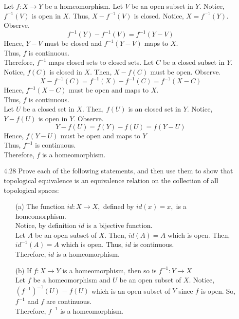 \documentclass[12pt]{article}
\begin{document}
\begin{enumerate}
	Let $f : X \rightarrow Y$ be a homeomorphism. Let $ V $ be an open subset in $ Y $. Notice, $ f^{-1}(V) $ is open in $ X $. Thus, $ X-f^{-1}(V) $ is closed. Notice, $ X=f^{-1}(Y) $. Observe.
		\[f^{-1}(Y)-f^{-1}(V)=f^{-1}(Y-V)\]
	Hence, $ Y-V $ must be closed and $ f^{-1}(Y-V) $ maps to $ X $.\\
	Thus, $ f $ is continuous.\\
	Therefore, $ f^{-1} $ maps closed sets to closed sets.
 	Let $C$ be a closed subset in $ Y $. Notice, $ f(C) $ is closed in $ X $. Then, $ X-f(C)  $ must be open. Observe.
 		\[X-f^{-1}(C)=f^{-1}(X)-f^{-1}(C)=f^{-1}(X-C)\]
 	Hence, $f^{-1}(X-C)$ must be open and maps to $ X $.\\
 	Thus, $ f $ is continuous.\\
 	Let $ U $ be a closed set in $ X $. Then, $ f(U)$ is an closed set in $ Y $. Notice, $ Y-f(U) $ is open in $ Y $. Observe.
 		\[Y-f(U)=f(Y)-f(U)=f(Y-U)\]
 	Hence, $ f(Y-U) $ must be open and maps to $Y$\\
 	Thus, $ f^{-1} $ is continuous.\\
 	Therefore, $ f $ is a homeomorphism.
	
	\item[4.28] Prove each of the following statements, and then use them to show that topological equivalence is an equivalence relation on the collection of all topological spaces:
	\begin{enumerate}
		\item[(a)] The function $i d : X \rightarrow X ,$ defined by $i d ( x ) = x ,$ is a homeomorphism.\\
		Notice,  by definition $ id $ is a bijective function.  \\
		Let $ A $ be an open subset of $ X $. Then, $ id(A)=A $ which is open. Then, $ id^{-1}(A)=A $ which is open. Thus, $ id $ is continuous.\\
		Therefore, $ id $ is a homeomorphism.
		
		\item[(b)] If $f : X \rightarrow Y$ is a homeomorphism, then so is $f ^ { - 1 } : Y \rightarrow X$\\
		Let $ f $ be a homeomorphism and $ U $ be an open subset of $ X $. Notice, $ (f^{-1})^{-1}(U)=f(U) $ which is an open subset of $ Y $ since $ f $ is open. So, $ f^{-1} $ and $ f $ are continuous.\\
		Therefore, $ f^{-1} $ is a homeomorphism.
		

\end{enumerate}
\end{enumerate}
\end{document}
